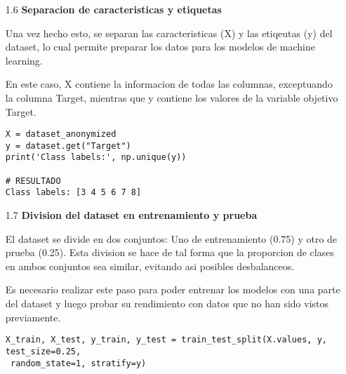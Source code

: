 \documentclass{article}
\begin{document}
\bigskip

\begin{itemize}

\item[1.6]  {\bf Separacion de caracteristicas y etiquetas}

Una vez hecho esto, se separan las caracteristicas (X) y las etiqeutas (y) del dataset, lo cual permite preparar los datos para los modelos de machine learning.

En este caso, X contiene la informacion de todas las columnas, exceptuando la columna Target, mientras que y contiene los valores de la variable objetivo Target.

\begin{tcolorbox}[width=14cm]
\begin{scriptsize}
\begin{verbatim}
X = dataset_anonymized
y = dataset.get("Target")
print('Class labels:', np.unique(y))

# RESULTADO
Class labels: [3 4 5 6 7 8]
\end{verbatim}
\end{scriptsize}
\end{tcolorbox}

\end{itemize}

\bigskip

\begin{itemize}

\item[1.7]  {\bf Division del dataset en entrenamiento y prueba}

El dataset se divide en dos conjuntos: Uno de entrenamiento (0.75) y otro de prueba (0.25). Esta division se hace de tal forma que la proporcion de clases en ambos conjuntos sea similar, evitando asi posibles desbalanceos.

Es necesario realizar este paso para poder entrenar los modelos con una parte del dataset y luego probar su rendimiento con datos que no han sido vistos previamente.

\begin{tcolorbox}[width=14cm]
\begin{scriptsize}
\begin{verbatim}
X_train, X_test, y_train, y_test = train_test_split(X.values, y, test_size=0.25,
 random_state=1, stratify=y)
\end{verbatim}
\end{scriptsize}
\end{tcolorbox}

\end{itemize}
\end{document}
